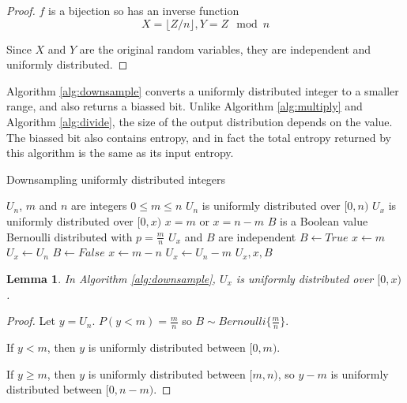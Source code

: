 \documentclass[12pt]{article}
\newtheorem{lemma}{Lemma}
\begin{document}
\begin{proof} $f$ is a bijection so has an inverse function 
\begin{equation}    
X = \lfloor Z/n \rfloor, Y = Z \mod n
\end{equation}

Since $X$ and $Y$ are the original random variables, they are independent and uniformly distributed.
\end{proof}

Algorithm \ref{alg:downsample} converts a uniformly distributed integer to a smaller range, and also returns a biassed bit. Unlike Algorithm \ref{alg:multiply} and Algorithm \ref{alg:divide}, the size of the output distribution depends on the value. The biassed bit also contains entropy, and in fact the total entropy returned by this algorithm is the same as its input entropy.

\begin{algorithm}
\caption{Downsampling uniformly distributed integers}
\label{alg:downsample}
\begin{algorithmic}[1]
    \Require $U_{n}$, $m$ and $n$ are integers 
    \Require $0 \le m \le n$
    \Require $U_{n}$ is uniformly distributed over $[0,n)$
\Ensure $U_{x}$ is uniformly distributed over $[0,x)$
\Ensure $x = m$ or $x=n-m$
\Ensure $B$ is a Boolean value Bernoulli distributed with $p=\frac{m}{n}$
\Ensure $U_x$ and $B$ are independent
    \State $B \gets True$  
    \State $x \gets m$
    \State $U_x \gets U_n$
  \Else
    \State $B \gets False$  
    \State $x \gets m-n$
    \State $U_x \gets U_n-m$
  \EndIf
  \State \Return $U_x, x, B$
\EndProcedure
\end{algorithmic}
\end{algorithm}

\begin{lemma}
In Algorithm \ref{alg:downsample}, $U_x$ is uniformly distributed over $[0,x)$.
\label{lem:downsample}
\end{lemma}

\begin{proof}
    Let $y = U_n$.
    $P(y<m) = \frac{m}{n}$ so $B \sim Bernoulli\{\frac{m}{n}\}$.

If $y < m$, then $y$ is uniformly distributed between $[0,m)$.

If $y \ge m$, then $y$ is uniformly distributed between $[m, n)$, so $y-m$ is uniformly distributed between $[0, n-m)$.
\end{proof}
\end{document}
